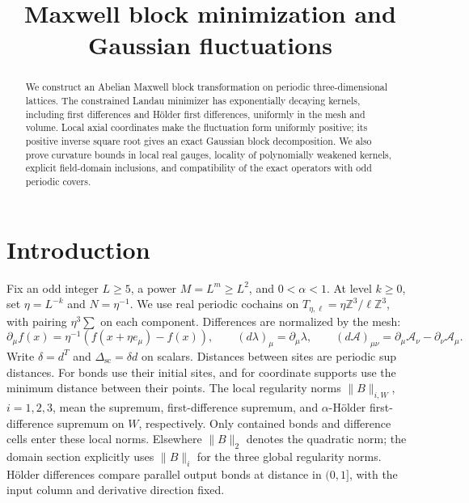 \documentclass[11pt,letterpaper,reqno]{amsart}
\title[Maxwell block minimization and Gaussian fluctuations]
 {Maxwell block minimization and Gaussian fluctuations}
\date{}
\newcommand{\Z}{\mathbb Z}
\begin{document}
\begin{abstract}
We construct an Abelian Maxwell block transformation on periodic
three-dimensional lattices. The constrained Landau minimizer has
exponentially decaying kernels, including first differences and
H\"older first differences, uniformly in the mesh and volume.
Local axial coordinates make the fluctuation form uniformly positive;
its positive inverse square root gives an exact Gaussian block
decomposition. We also prove curvature bounds in local real gauges,
locality of polynomially weakened kernels, explicit field-domain
inclusions, and compatibility of the exact operators with odd
periodic covers.
\end{abstract}
\maketitle
\tableofcontents
\section{Introduction}\label{sec:introduction}
Fix an odd integer \(L\ge5\), a power \(M=L^m\ge L^2\), and
\(0<\alpha<1\). At level \(k\ge0\), set
\(\eta=L^{-k}\) and \(N=\eta^{-1}\).
We use real periodic cochains on
\(T_{\eta,\ell}=\eta\Z^3/\ell\Z^3\), with pairing
\(\eta^3\sum\) on each component. Differences are normalized by
the mesh:
\[
 \partial_\mu f(x)=\eta^{-1}(f(x+\eta e_\mu)-f(x)),\qquad
 (d\lambda)_\mu=\partial_\mu\lambda,\qquad
 (d\mathscr A)_{\mu\nu}
   =\partial_\mu\mathscr A_\nu-\partial_\nu\mathscr A_\mu.
\]
Write \(\delta=d^T\) and \(\Delta_{\mathrm{sc}}=\delta d\)
on scalars. Distances between sites are periodic sup distances.
For bonds use their initial sites, and for coordinate supports use
the minimum distance between their points.
The local regularity norms \(\|B\|_{i,W}\), \(i=1,2,3\), mean
the supremum, first-difference supremum, and \(\alpha\)-H\"older
first-difference supremum on \(W\), respectively. Only contained
bonds and difference cells enter these local norms.
Elsewhere \(\|B\|_2\) denotes the quadratic norm; the domain
section explicitly uses \(\|B\|_i\) for the three global
regularity norms.
H\"older differences compare parallel output bonds at distance
in \((0,1]\), with the input column and derivative direction fixed.
\end{document}
